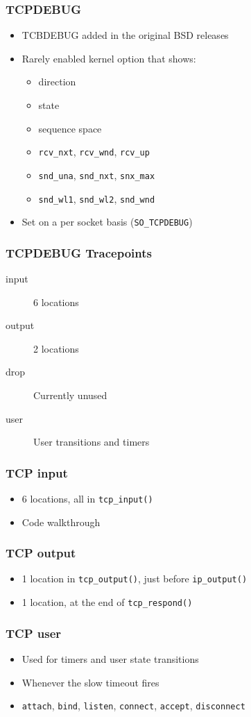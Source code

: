 \documentclass[pdftex]{beamer}
\begin{document}
\begin{frame}[fragile]
  \frametitle{TCPDEBUG}
  \begin{itemize}
  \item TCBDEBUG added in the original BSD releases
  \item Rarely enabled kernel option that shows:
    \begin{itemize}
    \item direction
    \item state
    \item sequence space
    \item \verb|rcv_nxt|, \verb|rcv_wnd|, \verb|rcv_up|
    \item \verb|snd_una|, \verb|snd_nxt|, \verb|snx_max|
    \item \verb|snd_wl1|, \verb|snd_wl2|, \verb|snd_wnd|
    \end{itemize}
  \item Set on a per socket basis (\verb|SO_TCPDEBUG|)
  \end{itemize}
\end{frame}

\begin{frame}
  \frametitle{TCPDEBUG Tracepoints}
  \begin{description}
  \item[input] 6 locations
  \item[output] 2 locations
  \item[drop] Currently unused
  \item[user] User transitions and timers
  \end{description}
\end{frame}

\begin{frame}[fragile]
  \frametitle{TCP input}
  \begin{itemize}
  \item 6 locations, all in \verb|tcp_input()|
  \item Code walkthrough
  \end{itemize}
\end{frame}

\begin{frame}[fragile]
  \frametitle{TCP output}
  \begin{itemize}
  \item 1 location in \verb|tcp_output()|, just before \verb|ip_output()|
  \item 1 location, at the end of \verb|tcp_respond()|
  \end{itemize}
\end{frame}

\begin{frame}[fragile]
  \frametitle{TCP user}
  \begin{itemize}
  \item Used for timers and user state transitions
  \item Whenever the slow timeout fires
  \item \verb|attach|, \verb|bind|, \verb|listen|, \verb|connect|,
    \verb|accept|, \verb|disconnect|
  \end{itemize}
\end{frame}
\end{document}
